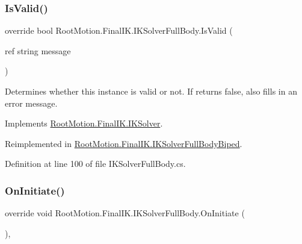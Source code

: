 \subsubsection{\texorpdfstring{Is\+Valid()}{IsValid()}}
{\footnotesize\ttfamily override bool Root\+Motion.\+Final\+I\+K.\+I\+K\+Solver\+Full\+Body.\+Is\+Valid (\begin{DoxyParamCaption}\item[{ref string}]{message }\end{DoxyParamCaption})\hspace{0.3cm}{\ttfamily [virtual]}}



Determines whether this instance is valid or not. If returns false, also fills in an error message. 



Implements \mbox{\hyperlink{class_root_motion_1_1_final_i_k_1_1_i_k_solver_a6ccc7496e7f4e95668e1c1bdaa051d67}{Root\+Motion.\+Final\+I\+K.\+I\+K\+Solver}}.



Reimplemented in \mbox{\hyperlink{class_root_motion_1_1_final_i_k_1_1_i_k_solver_full_body_biped_a3a3db44c5ef5d7a508492225ae161f10}{Root\+Motion.\+Final\+I\+K.\+I\+K\+Solver\+Full\+Body\+Biped}}.



Definition at line 100 of file I\+K\+Solver\+Full\+Body.\+cs.

\mbox{\label{class_root_motion_1_1_final_i_k_1_1_i_k_solver_full_body_a314815fbee3caadfd26d449764ee6e5c}} 
\subsubsection{\texorpdfstring{On\+Initiate()}{OnInitiate()}}
{\footnotesize\ttfamily override void Root\+Motion.\+Final\+I\+K.\+I\+K\+Solver\+Full\+Body.\+On\+Initiate (\begin{DoxyParamCaption}{ }\end{DoxyParamCaption})\hspace{0.3cm}{\ttfamily [protected]}, {\ttfamily [virtual]}}



